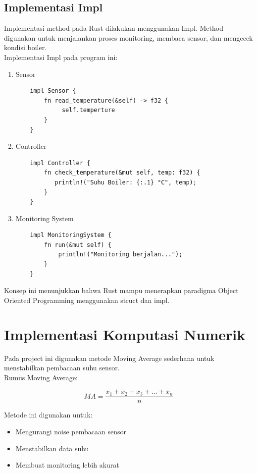 \documentclass[a4paper,12pt]{article}
\begin{document}
\subsection{Implementasi Impl}
Implementasi method pada Rust dilakukan menggunakan Impl. Method digunakan untuk menjalankan proses monitoring, membaca sensor, dan mengecek kondisi boiler.\\
Implementasi Impl pada program ini:
\begin{enumerate}
    \item Sensor
    \begin{verbatim}
    impl Sensor {
        fn read_temperature(&self) -> f32 {
             self.temperture
        }
    }
    \end{verbatim}
    \item Controller
    \begin{verbatim}
    impl Controller {
        fn check_temperature(&mut self, temp: f32) {
           println!("Suhu Boiler: {:.1} °C", temp);
        }
    }
    \end{verbatim}
    \item Monitoring System
    \begin{verbatim}
    impl MonitoringSystem {
        fn run(&mut self) {
            println!("Monitoring berjalan...");
        }
    }
    \end{verbatim}
\end{enumerate}
Konsep ini menunjukkan bahwa Rust mampu menerapkan paradigma Object Oriented Programming menggunakan struct dan impl.



\section{Implementasi Komputasi Numerik}

Pada project ini digunakan metode Moving Average sederhana untuk menstabilkan pembacaan suhu sensor.\\

Rumus Moving Average:

\[
MA = \frac{x_1 + x_2 + x_3 + ... + x_n}{n}
\]

Metode ini digunakan untuk:
\begin{itemize}
    \item Mengurangi noise pembacaan sensor
    \item Menstabilkan data suhu
    \item Membuat monitoring lebih akurat
\end{itemize}
\end{document}
